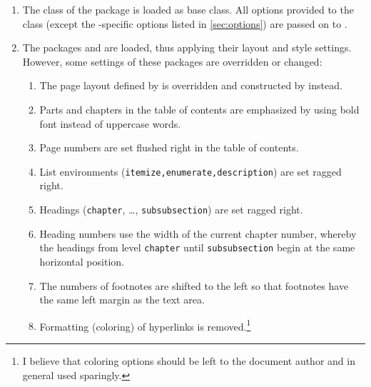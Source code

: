 \begin{enumerate}
	\item The  class of the  package is loaded as base class. All options provided to the class (except the -specific options listed in \cref{sec:options}) are passed on to .
   \item The packages  and  are loaded, thus applying their layout and style settings. However, some settings of these packages are overridden or changed:
   \begin{enumerate}
      \item The page layout defined by  is overridden and constructed by  instead.
      \item Parts and chapters in the table of contents are emphasized by using bold font instead of uppercase words.
      \item Page numbers are set flushed right in the table of contents.
      \item List environments (\lstinline|itemize,enumerate,description|) are set ragged right.
      \item Headings (\lstinline|chapter|, \dots, \lstinline|subsubsection|) are set ragged right.
      \item Heading numbers use the width of the current chapter number, whereby the headings from level \lstinline|chapter| until \lstinline|subsubsection| begin at the same horizontal position.
      \item The numbers of footnotes are shifted to the left so that footnotes have the same left margin as the text area.
      \item Formatting (coloring) of hyperlinks is removed.\footnote{I believe that coloring options should be left to the document author and in general used sparingly.}
   \end{enumerate}
\end{enumerate}
